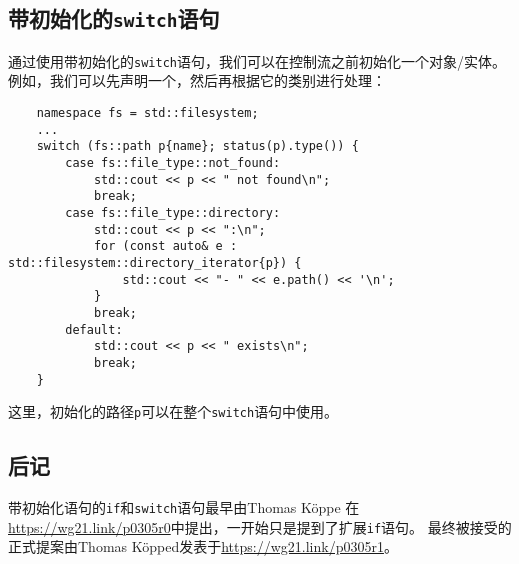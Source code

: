 \subsection{带初始化的\texttt{switch}语句}
通过使用带初始化的\texttt{switch}语句，我们可以在控制流之前初始化一个对象/实体。
例如，我们可以先声明一个，然后再根据它的类别进行处理：
\begin{lstlisting}
    namespace fs = std::filesystem;
    ...
    switch (fs::path p{name}; status(p).type()) {
        case fs::file_type::not_found:
            std::cout << p << " not found\n";
            break;
        case fs::file_type::directory:
            std::cout << p << ":\n";
            for (const auto& e : std::filesystem::directory_iterator{p}) {
                std::cout << "- " << e.path() << '\n';
            }
            break;
        default:
            std::cout << p << " exists\n";
            break;
    }
\end{lstlisting}
这里，初始化的路径\texttt{p}可以在整个\texttt{switch}语句中使用。

\subsection{后记}
带初始化语句的\texttt{if}和\texttt{switch}语句最早由Thomas Köppe
在\url{https://wg21.link/p0305r0}中提出，一开始只是提到了扩展\texttt{if}语句。
最终被接受的正式提案由Thomas Köpped发表于\url{https://wg21.link/p0305r1}。